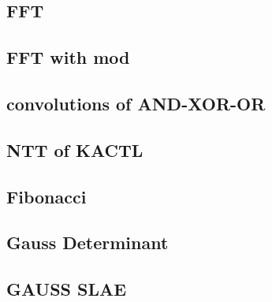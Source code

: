 \subsection{FFT}
\vspace{-2ex}
\raggedbottom
\vspace{-3.2ex}
\hrulefill
\subsection{FFT with mod}
\vspace{-2ex}
\raggedbottom
\vspace{-3.2ex}
\hrulefill
\subsection{convolutions of AND-XOR-OR}
\vspace{-2ex}
\raggedbottom
\vspace{-3.2ex}
\hrulefill
\subsection{NTT of KACTL}
\vspace{-2ex}
\raggedbottom
\vspace{-3.2ex}
\hrulefill
\subsection{Fibonacci}
\vspace{-2ex}
\raggedbottom
\vspace{-3.2ex}
\hrulefill
\subsection{Gauss Determinant}
\vspace{-2ex}
\raggedbottom
\vspace{-3.2ex}
\hrulefill
\subsection{GAUSS SLAE}
\vspace{-2ex}
\raggedbottom
\vspace{-3.2ex}
\hrulefill
